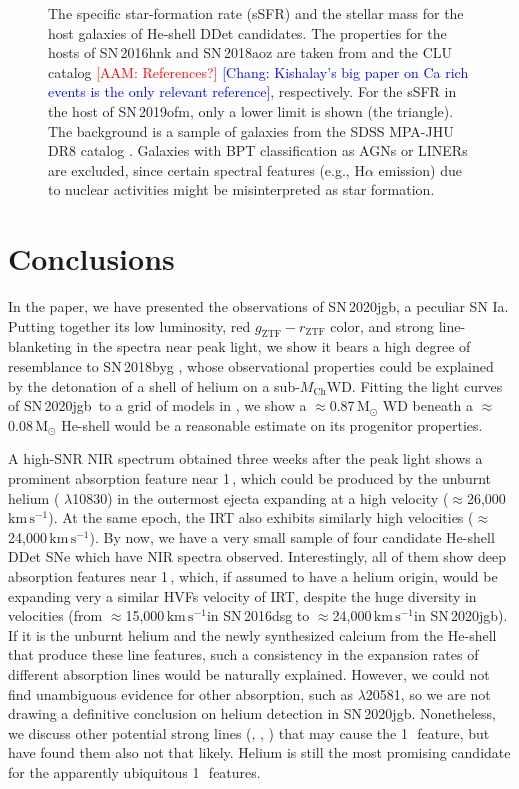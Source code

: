 \documentclass[twocolumn]{aastex631}
\newcommand{\sn}{SN\,2020jgb}
\newcommand{\Mch}{$M_\mathrm{Ch}$}
\newcommand{\kms}{$\mathrm{km}\,\mathrm{s}^{-1}$}
\newcommand{\adam}[1]{\textcolor{red}{[AAM: #1]}}
\newcommand{\chang}[1]{\textcolor{blue}{[Chang: #1]}}
\begin{document}
{\begin{figure}
    \caption{The specific star-formation rate (sSFR) and the stellar mass for the host galaxies of He-shell DDet candidates. The properties for the hosts of SN\,2016hnk and SN\,2018aoz are taken from \citet{Dong_Ca-rich_2022} and the CLU catalog \adam{References?} \chang{Kishalay's big paper on Ca rich events is the only relevant reference}, respectively. For the sSFR in the host of SN\,2019ofm, only a lower limit is shown (the triangle). The background is a sample of galaxies from the SDSS MPA-JHU DR8 catalog \citep{Kauffmann_SDSS_2003,Brinchmann_SDSS_2004}. Galaxies with BPT classification as AGNs or LINERs are excluded, since certain spectral features (e.g., H$\alpha$ emission) due to nuclear activities might be misinterpreted as star formation.}
    \label{fig:host}
\end{figure}

\section{Conclusions} \label{sec:conclusion}
In the paper, we have presented the observations of \sn, a peculiar SN Ia. Putting together its low luminosity, red $g_\mathrm{ZTF}-r_\mathrm{ZTF}$ color, and strong line-blanketing in the spectra near peak light, we show it bears a high degree of resemblance to SN\,2018byg \citep{de_18byg_2019}, whose observational properties could be explained by the detonation of a shell of helium on a sub-\Mch WD. Fitting the light curves of \sn\ to a grid of models in \citet{polin_observational_2019}, we show a $\approx$0.87\,$\mathrm{M_\odot}$ WD beneath a $\approx$0.08\,$\mathrm{M_\odot}$ He-shell would be a reasonable estimate on its progenitor properties.

A high-SNR NIR spectrum obtained three weeks after the peak light shows a prominent absorption feature near 1\,\micron, which could be produced by the unburnt helium ( $\lambda$10830) in the outermost ejecta expanding at a high velocity ($\approx$26,000\,\kms). At the same epoch, the  IRT also exhibits similarly high velocities ($\approx$24,000\,\kms). By now, we have a very small sample of four candidate He-shell DDet SNe which have NIR spectra observed. Interestingly, all of them show deep absorption features near 1\,\micron, which, if assumed to have a helium origin, would be expanding very a similar HVFs velocity of  IRT, despite the huge diversity in velocities (from $\approx$15,000\,\kms in SN\,2016dsg to $\approx$24,000\,\kms in \sn). If it is the unburnt helium and the newly synthesized calcium from the He-shell that produce these line features, such a consistency in the expansion rates of different absorption lines would be naturally explained. However, we could not find unambiguous evidence for other  absorption, such as  $\lambda$20581, so we are not drawing a definitive conclusion on helium detection in \sn. Nonetheless, we discuss other potential strong lines (, , ) that may cause the 1\,\micron\ feature, but have found them also not that likely. Helium is still the most promising candidate for the apparently ubiquitous 1\,\micron\ features.

}
\end{document}
